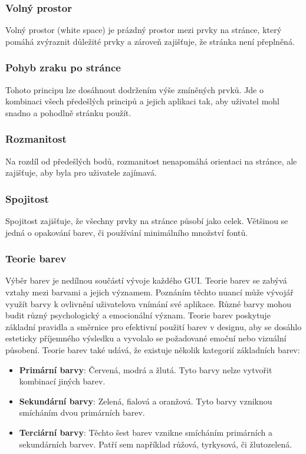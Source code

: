 \subsubsection*{Volný prostor}
Volný prostor (white space) je prázdný prostor mezi prvky na stránce, který pomáhá zvýraznit důležité prvky a zároveň zajišťuje, že stránka není přeplněná.

\subsubsection*{Pohyb zraku po stránce}
Tohoto principu lze dosáhnout dodržením výše zmíněných prvků. Jde o kombinaci všech předešlých principů a jejich aplikaci tak, aby uživatel mohl snadno a pohodlně stránku použít.

\subsubsection*{Rozmanitost}
Na rozdíl od předešlých bodů, rozmanitost nenapomáhá orientaci na stránce, ale zajišťuje, aby byla pro uživatele zajímavá.

\subsubsection*{Spojitost}
Spojitost zajišťuje, že všechny prvky na stránce působí jako celek. Většinou se jedná o opakování barev, či používání minimálního množství fontů.

\subsubsection{Teorie barev}
Výběr barev je nedílnou součástí vývoje každého GUI. Teorie barev se zabývá vztahy mezi barvami a jejich významem. Poznáním těchto nuancí může vývojář využít barvy k ovlivnění uživatelova vnímání své aplikace. Různé barvy mohou budit různý psychologický a emocionální význam. Teorie barev poskytuje základní pravidla a směrnice pro efektivní použití barev v designu, aby se dosáhlo esteticky příjemného výsledku a vyvolalo se požadované emoční nebo vizuální působení. Teorie barev také udává, že existuje několik kategorií základních barev:
\begin{itemize}
    \item \textbf{Primární barvy}: Červená, modrá a žlutá. Tyto barvy nelze vytvořit kombinací jiných barev.
    \item \textbf{Sekundární barvy}: Zelená, fialová a oranžová. Tyto barvy vzniknou smícháním dvou primárních barev.
    \item \textbf{Terciární barvy}: Těchto šest barev vznikne smícháním primárních a sekundárních barvev. Patří sem například růžová, tyrkysová, či žlutozelená.
\end{itemize}

